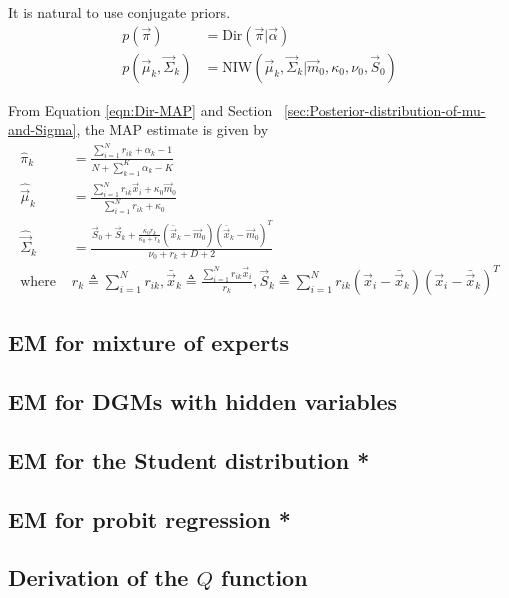 It is natural to use conjugate priors. 
\begin{align*}
p(\vec{\pi}) & = \mathrm{Dir}(\vec{\pi}|\vec{\alpha}) \\
p(\vec{\mu}_k,\vec{\Sigma}_k) & = \mathrm{NIW}(\vec{\mu}_k,\vec{\Sigma}_k|\vec{m}_0,\kappa_0,\nu_0,\vec{S}_0)
\end{align*}

From Equation \eqref{eqn:Dir-MAP} and Section ~\ref{sec:Posterior-distribution-of-mu-and-Sigma}, the MAP estimate is given by
\begin{align}
\hat{\pi}_k & = \frac{\sum_{i=1}^N r_{ik}+\alpha_k-1}{N+\sum_{k=1}^K \alpha_k-K} \\
\hat{\vec{\mu}}_k & = \frac{\sum_{i=1}^N r_{ik}\vec{x}_i + \kappa_0\vec{m}_0}{\sum_{i=1}^N r_{ik} + \kappa_0} \\
\hat{\vec{\Sigma}}_k & = \frac{\vec{S}_0+\vec{S}_k+\frac{\kappa_0r_k}{\kappa_0+r_k}(\bar{\vec{x}}_k-\vec{m}_0)(\bar{\vec{x}}_k-\vec{m}_0)^T}{\nu_0+r_k+D+2} \\
\text{where } & r_k \triangleq \sum_{i=1}^N r_{ik}, \bar{\vec{x}}_k \triangleq \frac{\sum_{i=1}^N r_{ik}\vec{x}_i}{r_k},\vec{S}_k \triangleq \sum_{i=1}^N r_{ik} (\vec{x}_i-\bar{\vec{x}}_k)(\vec{x}_i-\bar{\vec{x}}_k)^T \nonumber
\end{align}


\subsection{EM for mixture of experts}


\subsection{EM for DGMs with hidden variables}


\subsection{EM for the Student distribution *}


\subsection{EM for probit regression *}


\subsection{Derivation of the $Q$ function}
\label{sec:Derivation-of-the-Q-function}

